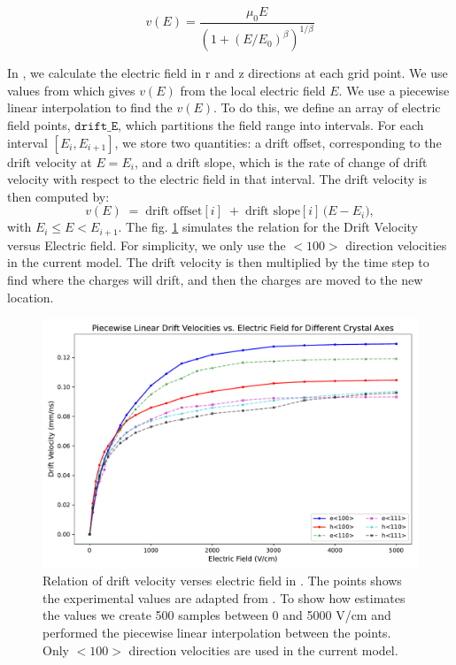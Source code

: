 \begin{equation}
v(E) = \frac{\mu_0 E}{(1 + (E/E_0)^\beta)^{1/\beta}}
\end{equation}

In {\ehd}, we calculate the electric field in r and z directions at each grid point. We use values from \cite{OMAR19871351} which gives $v(E)$ from the local electric field $E$. We use a piecewise linear interpolation to find the $v(E)$. To do this, we define an array of electric field points, $\texttt{drift\_E}$, which partitions the field range into intervals. For each interval $[E_i, E_{i+1}]$, we store two quantities: a drift offset, corresponding to the drift velocity at $E = E_i$, and a drift slope, which is the rate of change of drift velocity with respect to the electric field in that interval. The drift velocity is then
computed by:
\[
v(E) \;=\; \text{drift offset}[i]
\;+\; \text{drift slope}[i] \,\bigl( E - E_i \bigr),
\]
with $E_i \le E < E_{i+1}$. The fig. \ref{ch3:fig:dv_vs_e} simulates the relation for the Drift Velocity versus Electric field.  For simplicity, we only use the $<100>$ direction velocities in the current model. The drift velocity is then multiplied by the time step to find where the charges will drift, and then the charges are moved to the new location.

\begin{figure}[!htb]
    \includegraphics[trim={0cm 0 0cm 0},clip,width=0.99\linewidth]{ch3/figs/ehd_dv_e.pdf}
    \caption{Relation of drift velocity verses electric field in {\ehd}. The points shows the experimental values are adapted from \cite{OMAR19871351}. To show how {\ehd} estimates the values we create 500 samples between 0 and 5000 V/cm and performed the piecewise linear interpolation between the points. Only $<100>$ direction velocities are used in the current model.}
    \label{ch3:fig:dv_vs_e}
\end{figure}

